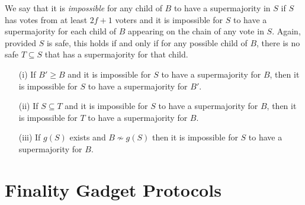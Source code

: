\documentclass[a4paper,UKenglish,cleveref, autoref, thm-restate, anonymous]{lipics-v2019}
\begin{document}
We say that it is {\em impossible} for any child of $B$ to have a supermajority in $S$ if $S$ has votes from at least $2f+1$ voters and it is impossible for $S$ to have a supermajority for each child of $B$ appearing on the chain of any vote in $S$.
Again, provided $S$ is safe, this holds if and only if for any possible child of $B$, there is no safe $T \subseteq S$ that has a supermajority for that child.
\begin{lemma} \label{lem:impossible}
\begin{itemize}
\item[(i)] If $B' \geq B$ and it is impossible for $S$ to have a supermajority for $B$, then it is impossible for $S$ to have a supermajority for $B'$.
\item[(ii)] If $S \subseteq T$ and it is impossible for $S$ to have a supermajority for $B$, then it is impossible for $T$ to have a supermajority for $B$.
\item[(iii)] If $g(S)$ exists and $B \nsim g(S)$ then it is impossible for $S$ to have a supermajority for $B$.
\end{itemize}
\end{lemma}


\section{Finality Gadget Protocols} \label{sec:finality}
\end{document}
